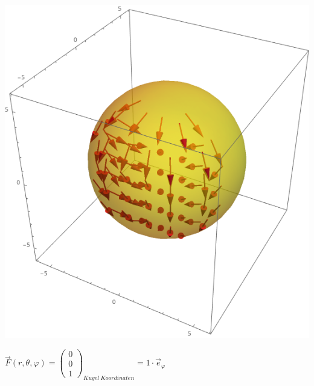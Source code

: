 					\formulaEnd
					\begin{center}

					\includegraphics[scale=0.4]{spherical_theta.png}

					\end{center}


					\formulaBegin
						$\vec{F}(r, \theta, \varphi) = \left(\begin{array}{c} 0 \\ 0 \\ 1 \end{array}\right)_{Kugel\ Koordinaten} = 1 \cdot \vec{e}_\varphi$ \\

